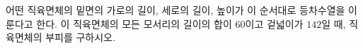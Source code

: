 어떤 직육면체의 밑면의 가로의 길이, 세로의 길이, 높이가 이 순서대로 등차수열을 이룬다고 한다. 이 직육면체의 모든 모서리의 길이의 합이 $60$이고 겉넓이가 $142$일 때, 직육면체의 부피를 구하시오.
